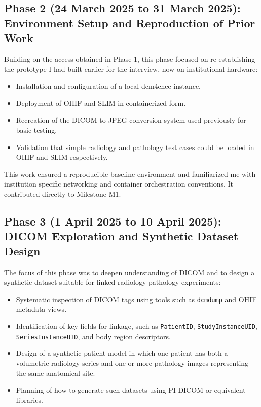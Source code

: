 \documentclass[11pt,a4paper]{article}
\begin{document}
\subsection*{Phase 2 (24 March 2025 to 31 March 2025): Environment Setup and Reproduction of Prior Work}

Building on the access obtained in Phase 1, this phase focused on re establishing the prototype I had built earlier for the interview, now on institutional hardware:

\begin{itemize}
    \item Installation and configuration of a local dcm4chee instance.
    \item Deployment of OHIF and SLIM in containerized form.
    \item Recreation of the DICOM to JPEG conversion system used previously for basic testing.
    \item Validation that simple radiology and pathology test cases could be loaded in OHIF and SLIM respectively.
\end{itemize}

This work ensured a reproducible baseline environment and familiarized me with institution specific networking and container orchestration conventions. It contributed directly to Milestone M1.

\subsection*{Phase 3 (1 April 2025 to 10 April 2025): DICOM Exploration and Synthetic Dataset Design}

The focus of this phase was to deepen understanding of DICOM and to design a synthetic dataset suitable for linked radiology pathology experiments:

\begin{itemize}
    \item Systematic inspection of DICOM tags using tools such as \texttt{dcmdump} and OHIF metadata views.
    \item Identification of key fields for linkage, such as \texttt{PatientID}, \texttt{StudyInstanceUID}, \texttt{SeriesInstanceUID}, and body region descriptors.
    \item Design of a synthetic patient model in which one patient has both a volumetric radiology series and one or more pathology images representing the same anatomical site.
    \item Planning of how to generate such datasets using PI DICOM or equivalent libraries.
\end{itemize}
\end{document}
